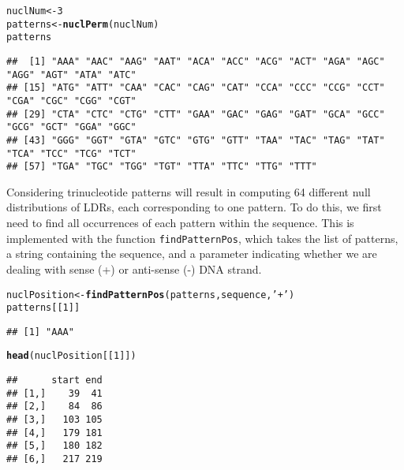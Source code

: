 \documentclass{article}\usepackage[]{graphicx}\usepackage[]{color}
\makeatletter
\newcommand{\hlnum}[1]{\textcolor[rgb]{0.686,0.059,0.569}{#1}}%
\newcommand{\hlstr}[1]{\textcolor[rgb]{0.192,0.494,0.8}{#1}}%
\newcommand{\hlstd}[1]{\textcolor[rgb]{0.345,0.345,0.345}{#1}}%
\newcommand{\hlkwb}[1]{\textcolor[rgb]{0.69,0.353,0.396}{#1}}%
\newcommand{\hlkwd}[1]{\textcolor[rgb]{0.737,0.353,0.396}{\textbf{#1}}}%
\newenvironment{kframe}{%
 \def\at@end@of@kframe{}%
 \ifinner\ifhmode%
  \def\at@end@of@kframe{\end{minipage}}%
  \begin{minipage}{\columnwidth}%
 \fi\fi%
 \def\FrameCommand##1{\hskip\@totalleftmargin \hskip-\fboxsep
 \colorbox{shadecolor}{##1}\hskip-\fboxsep
     \hskip-\linewidth \hskip-\@totalleftmargin \hskip\columnwidth}%
 \MakeFramed {\advance\hsize-\width
   \@totalleftmargin\z@ \linewidth\hsize
   \@setminipage}}%
 {\par\unskip\endMakeFramed%
 \at@end@of@kframe}
\newenvironment{knitrout}{}{} %
\makeatother
\begin{document}
\begin{knitrout}
\color{fgcolor}\begin{kframe}
\begin{alltt}
\hlstd{nuclNum} \hlkwb{<-} \hlnum{3}
\hlstd{patterns} \hlkwb{<-} \hlkwd{nuclPerm}\hlstd{(nuclNum)}
\hlstd{patterns}
\end{alltt}
\begin{verbatim}
##  [1] "AAA" "AAC" "AAG" "AAT" "ACA" "ACC" "ACG" "ACT" "AGA" "AGC" "AGG" "AGT" "ATA" "ATC"
## [15] "ATG" "ATT" "CAA" "CAC" "CAG" "CAT" "CCA" "CCC" "CCG" "CCT" "CGA" "CGC" "CGG" "CGT"
## [29] "CTA" "CTC" "CTG" "CTT" "GAA" "GAC" "GAG" "GAT" "GCA" "GCC" "GCG" "GCT" "GGA" "GGC"
## [43] "GGG" "GGT" "GTA" "GTC" "GTG" "GTT" "TAA" "TAC" "TAG" "TAT" "TCA" "TCC" "TCG" "TCT"
## [57] "TGA" "TGC" "TGG" "TGT" "TTA" "TTC" "TTG" "TTT"
\end{verbatim}
\end{kframe}
\end{knitrout}

Considering trinucleotide patterns will result in computing
64 different null distributions of LDRs, each
corresponding to one pattern. To do this, we first need to find all occurrences
of each pattern within the sequence. This is implemented with the function
\texttt{findPatternPos}, which takes the list of patterns, a string containing
the sequence, and a parameter indicating whether we are dealing with sense (+)
or anti-sense (-) DNA strand.

\begin{knitrout}
\color{fgcolor}\begin{kframe}
\begin{alltt}
\hlstd{nuclPosition} \hlkwb{<-} \hlkwd{findPatternPos}\hlstd{(patterns, sequence,} \hlstr{'+'}\hlstd{)}
\hlstd{patterns[[}\hlnum{1}\hlstd{]]}
\end{alltt}
\begin{verbatim}
## [1] "AAA"
\end{verbatim}
\begin{alltt}
\hlkwd{head}\hlstd{(nuclPosition[[}\hlnum{1}\hlstd{]])}
\end{alltt}
\begin{verbatim}
##      start end
## [1,]    39  41
## [2,]    84  86
## [3,]   103 105
## [4,]   179 181
## [5,]   180 182
## [6,]   217 219
\end{verbatim}
\end{kframe}
\end{knitrout}
\end{document}
